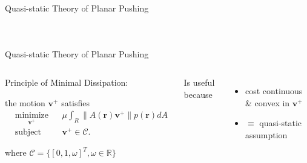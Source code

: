 \documentclass[10pt]{beamer}
\begin{document}
\begin{frame}{Quasi-static Theory of Planar Pushing}
\begin{columns}[c,onlytextwidth]
\begin{figure}
\begin{tikzpicture}[
        scale=1.25, every node/.style={scale=1.25},
        force/.style={>=latex,draw=black,fill=black},
        axis/.style={densely dashed,draw=gray,font=\small},
        ]
      \end{tikzpicture}
    \end{figure}

  \end{columns}
\end{frame}

\begin{frame}{Quasi-static Theory of Planar Pushing}
  \begin{columns}[c,onlytextwidth]

    \begin{list}{}{
        \setlength{\leftmargin}{0pt}
        \setlength{\labelwidth}{0pt}
        \setlength{\labelsep}{0pt}
      }
    \item Principle of Minimal Dissipation:
    \item the motion $\mathbf{v}^+$ satisfies
      \begin{equation*} \begin{aligned}
          & \underset{\mathbf{v}^+}{\text{minimize}}
          & & \mu\int_R\lVert A(\mathbf{r})\mathbf{v}^+ \rVert p(\mathbf{r}) dA \\
          & \text{subject to}
          & & \mathbf{v}^+ \in \mathcal{C}.
        \end{aligned} \label{eq:constrained-frictional-dissipation}
      \end{equation*}
    \item where $\mathcal{C} = \{[0,1,\omega]^T, \omega \in \mathbb{R}\}$
    \end{list}\vspace{3.5mm}

    Is useful because
    \begin{itemize}
    \item cost continuous \& convex in $\mathbf{v}^+$
    \item $\equiv$ quasi-static assumption
    \end{itemize}


\end{columns}
\end{frame}
\end{document}
